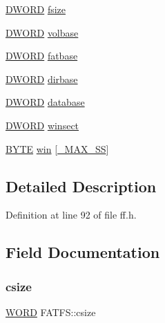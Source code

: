 \begin{DoxyCompactItemize}
\item 
\hyperlink{integer_8h_ad342ac907eb044443153a22f964bf0af}{D\+W\+O\+RD} \hyperlink{structFATFS_a53e9560659f14e66f306c2c444198bf3}{fsize}
\item 
\hyperlink{integer_8h_ad342ac907eb044443153a22f964bf0af}{D\+W\+O\+RD} \hyperlink{structFATFS_a8f0ca578755749d204f59dc83f1a7649}{volbase}
\item 
\hyperlink{integer_8h_ad342ac907eb044443153a22f964bf0af}{D\+W\+O\+RD} \hyperlink{structFATFS_a848fba02c4aabe02ef2984e578f33d64}{fatbase}
\item 
\hyperlink{integer_8h_ad342ac907eb044443153a22f964bf0af}{D\+W\+O\+RD} \hyperlink{structFATFS_a3f72fd998dbcce4652a85a81fe944bc4}{dirbase}
\item 
\hyperlink{integer_8h_ad342ac907eb044443153a22f964bf0af}{D\+W\+O\+RD} \hyperlink{structFATFS_a5b6c0bc2e9fd2ae8ef714210a74a2d5d}{database}
\item 
\hyperlink{integer_8h_ad342ac907eb044443153a22f964bf0af}{D\+W\+O\+RD} \hyperlink{structFATFS_ac60e69c00e6bf7c25febfbac4dc1476b}{winsect}
\item 
\hyperlink{lz4_8c_a4ae1dab0fb4b072a66584546209e7d58}{B\+Y\+TE} \hyperlink{structFATFS_a7cc35a593465e727ab87723c14610644}{win} \mbox{[}\hyperlink{ffconf_8h_ac271b697378912f17132cb9c7d0de024}{\+\_\+\+M\+A\+X\+\_\+\+SS}\mbox{]}
\end{DoxyCompactItemize}


\subsection{Detailed Description}


Definition at line 92 of file ff.\+h.



\subsection{Field Documentation}
\mbox{\label{structFATFS_ad7fa7a509f8d097a9ab182d6c47be568}} 
\subsubsection{\texorpdfstring{csize}{csize}}
{\footnotesize\ttfamily \hyperlink{integer_8h_a197942eefa7db30960ae396d68339b97}{W\+O\+RD} F\+A\+T\+F\+S\+::csize}




